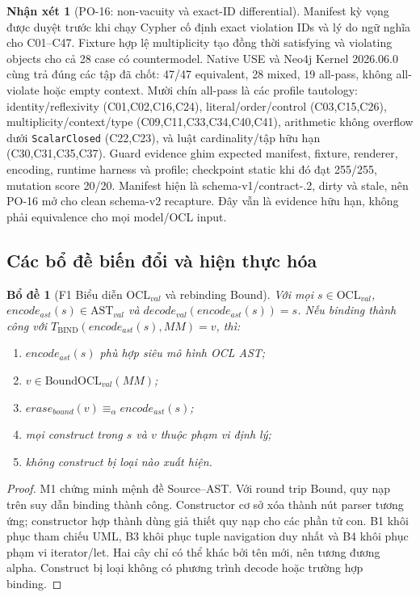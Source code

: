 \documentclass[11pt,a4paper]{article}
\newtheorem{lemma}{Bổ đề}
\theoremstyle{definition}
\newtheorem{remark}{Nhận xét}
\newcommand{\OCLval}{\mathrm{OCL}_{val}}
\newcommand{\ASTval}{\mathrm{AST}_{val}}
\newcommand{\BoundOCLval}{\mathrm{BoundOCL}_{val}}
\begin{document}
\begin{remark}[PO-16: non-vacuity và exact-ID differential]
Manifest kỳ vọng được duyệt trước khi chạy Cypher cố định exact violation IDs
và lý do ngữ nghĩa cho C01--C47. Fixture hợp lệ multiplicity tạo đồng thời
satisfying và violating objects cho cả 28 case có countermodel. Native USE và
Neo4j Kernel 2026.06.0 cùng trả đúng các tập đã chốt: 47/47 equivalent, 28 mixed,
19 all-pass, không all-violate hoặc empty context. Mười chín all-pass là các
profile tautology: identity/reflexivity (C01,C02,C16,C24), literal/order/control
(C03,C15,C26), multiplicity/context/type (C09,C11,C33,C34,C40,C41), arithmetic
không overflow dưới \texttt{ScalarClosed} (C22,C23), và luật cardinality/tập hữu
hạn (C30,C31,C35,C37). Guard evidence ghim expected manifest, fixture, renderer,
encoding, runtime harness và profile; checkpoint static khi đó đạt 255/255,
mutation score 20/20. Manifest hiện là schema-v1/contract-.2, dirty và stale,
nên PO-16 mở cho clean schema-v2 recapture. Đây vẫn là evidence hữu hạn, không phải equivalence cho
mọi model/OCL input.
\end{remark}

\subsection{Các bổ đề biến đổi và hiện thực hóa}

\begin{lemma}[F1 Biểu diễn $\OCLval$ và rebinding Bound]
Với mọi $s\in\OCLval$, $encode_{ast}(s)\in\ASTval$ và
$decode_{val}(encode_{ast}(s))=s$. Nếu binding thành công với
$T_{\mathrm{BIND}}(encode_{ast}(s),MM)=v$, thì:
\begin{enumerate}[label=(\roman*)]
  \item $encode_{ast}(s)$ phù hợp siêu mô hình OCL AST;
  \item $v\in\BoundOCLval(MM)$;
  \item $erase_{bound}(v)\equiv_{\alpha}encode_{ast}(s)$;
  \item mọi construct trong $s$ và $v$ thuộc phạm vi định lý;
  \item không construct bị loại nào xuất hiện.
\end{enumerate}
\end{lemma}
\begin{proof}
M1 chứng minh mệnh đề Source--AST. Với round trip Bound, quy nạp trên suy dẫn
binding thành công. Constructor cơ sở xóa thành nút parser tương ứng; constructor
hợp thành dùng giả thiết quy nạp cho các phần tử con. B1 khôi phục tham chiếu UML,
B3 khôi phục tuple navigation duy nhất và B4 khôi phục phạm vi iterator/let.
Hai cây chỉ có thể khác bởi tên mới, nên tương đương alpha. Construct bị loại
không có phương trình decode hoặc trường hợp binding.
\end{proof}
\end{document}
